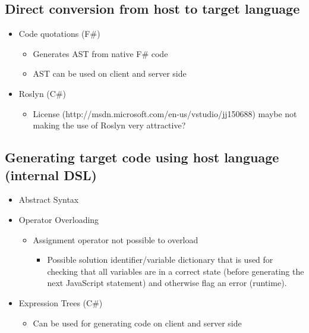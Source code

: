 	\subsection{Direct conversion from host to target language}
		\begin{itemize}
			\item Code quotations (F\#)
				\begin{itemize}
					\item Generates AST from native F\# code
					\item AST can be used on client and server side
				\end{itemize}
			\item Roslyn (C\#)
				\begin{itemize}
					\item License (http://msdn.microsoft.com/en-us/vstudio/jj150688) maybe not making the use of Roslyn very attractive?
				\end{itemize}
		\end{itemize}

		

	\subsection{Generating target code using host language (internal DSL)}
		\begin{itemize}
			\item Abstract Syntax
			\item Operator Overloading
				\begin{itemize}
					\item Assignment operator not possible to overload
						\begin{itemize}
							\item Possible solution identifier/variable dictionary that is used for checking that all variables are in a correct state (before generating the next JavaScript statement) and otherwise flag an error (runtime).
						\end{itemize}
				\end{itemize}
			\item Expression Trees (C\#)
				\begin{itemize}
					\item Can be used for generating code on client and server side
				\end{itemize}
		\end{itemize}